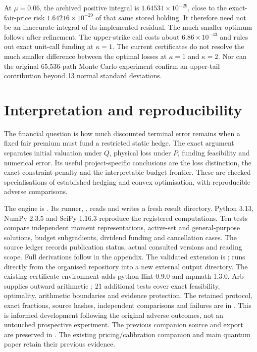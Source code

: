 \documentclass[11pt]{article}
\begin{document}
At $\mu=0.06$, the archived positive integral is
$1.64531\times10^{-29}$, close to the exact-fair-price risk
$1.64216\times10^{-29}$ of that same stored holding. It therefore
need not be an inaccurate integral of its implemented residual.
The much smaller optimum follows after refinement. The upper-strike
call costs about $6.86\times10^{-43}$ and rules out exact unit-call
funding at $\kappa=1$. The current certificates do not resolve the much
smaller difference between the optimal losses at $\kappa=1$ and
$\kappa=2$. Nor can the original 65,536-path Monte Carlo experiment
confirm an upper-tail contribution beyond 13 normal standard deviations.

\section{Interpretation and reproducibility}

The financial question is how much discounted terminal error remains
when a fixed fair premium must fund a restricted static hedge.
The exact argument separates initial valuation under $Q$, physical
loss under $P$, funding feasibility and numerical error. Its useful
project-specific conclusions are the loss distinction, the exact
constraint penalty and the interpretable budget frontier. These are
checked specialisations of established hedging and convex optimisation,
with reproducible adverse comparisons.

The engine is . Its runner,
, reads
 and writes a fresh result
directory. Python 3.13, NumPy 2.3.5 and SciPy 1.16.3 reproduce the
registered computations. Ten tests compare independent moment
representations, active-set and general-purpose solutions, budget
subgradients, dividend funding and cancellation cases.
The source ledger records publication status, actual consulted versions
and reading scope. Full derivations follow in the appendix.
The validated extension is ;
 runs directly from the
organised repository into a new external output directory. The existing
certificate environment adds python-flint 0.9.0 and mpmath 1.3.0.
Arb supplies outward arithmetic \citep{johansson2017}; 21 additional tests
cover exact feasibility, optimality, arithmetic boundaries and evidence
protection. The retained protocol, exact fractions, source hashes,
independent comparisons and failures are in
.
This is informed development following the original adverse outcomes,
not an untouched prospective experiment. The previous companion source
and export are preserved in
.
The existing pricing/calibration companion and main quantum paper
retain their previous evidence.
\end{document}
